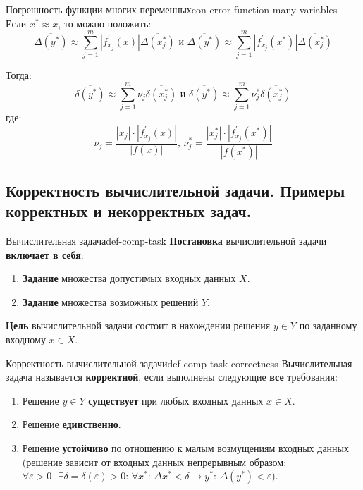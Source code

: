 \documentclass[14pt]{extarticle}
\begin{document}
        \begin{consequence}{Погрешность функции многих переменных}{con-error-function-many-variables}
            Если $x^{*} \approx x$, то можно положить:
            $$\overline{\Delta(y^{*})} \approx \sum_{j=1}^{m}|f_{x_{j}}^{'}(x)|\overline{\Delta(x_{j}^{*})} \text{ и } \overline{\Delta(y^{*})} \approx \sum_{j=1}^{m}|f_{x_{j}}^{'}(x^{*})|\overline{\Delta(x_{j}^{*})}$$
        
            Тогда:
            $$\overline{\delta(y^{*})} \approx \sum_{j=1}^{m} \nu_{j}\overline{\delta(x_{j}^{*})} \text{ и } \overline{\delta(y^{*})} \approx \sum_{j=1}^{m} \nu_{j}^{*}\overline{\delta(x_{j}^{*})}$$        
            где:
            $$\nu_{j} = \frac{|x_{j}|\cdot|f_{x_{j}}^{'}(x)|}{|f(x)|} \text{, } \nu_{j}^{*} = \frac{|x_{j}^{*}|\cdot|f_{x_{j}}^{'}(x^{*})|}{|f(x^{*})|}$$
        \end{consequence}

\clearpage
\subsection{Корректность вычислительной задачи. Примеры корректных и некорректных задач.}
    
    \begin{definition}{Вычислительная задача}{def-comp-task}
        \textbf{Постановка} вычислительной задачи \textbf{включает в себя}: 
        \begin{enumerate}
            \item \textbf{Задание} множества допустимых входных данных $X$.
            \item \textbf{Задание} множества возможных решений $Y$. 
        \end{enumerate}

        \vspace{\baselineskip}

        \textbf{Цель} вычислительной задачи состоит в нахождении решения $y \in Y$ по заданному входному $x \in X$.
    \end{definition}

    \begin{definition}{Корректность вычислительной задачи}{def-comp-task-correctness}
        Вычислительная задача называется \textbf{корректной}, если выполнены следующие \textbf{все} требования: 
        \begin{enumerate}
            \item Решение $y \in Y$ \textbf{существует} при любых входных данных $x \in X$.
            \item Решение \textbf{единственно}.
            \item Решение \textbf{устойчиво} по отношению к малым возмущениям входных данных (решение зависит от входных данных непрерывным образом: $\forall \varepsilon > 0 \text{ } \exists \delta = \delta(\varepsilon) > 0 \text{: } \forall x^{*} \text{: } \Delta{x^{*}} < \delta \rightarrow y^{*} \text{: } \Delta(y^{*}) < \varepsilon$). 
        \end{enumerate}
    \end{definition}
\end{document}
